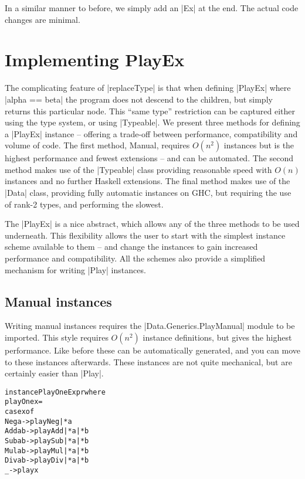 \documentclass[preprint]{sigplanconf}
\newenvironment{code}{\begin{alltt}\small}{\end{alltt}}
\begin{document}
In a similar manner to before, we simply add an |Ex| at the end. The actual code changes are minimal.

\section{Implementing PlayEx}
\label{sec:implement_playex}

The complicating feature of |replaceType| is that when defining |PlayEx| where |alpha == beta| the program does not descend to the children, but simply returns this particular node. This ``same type'' restriction can be captured either using the type system, or using |Typeable|. We present three methods for defining a |PlayEx| instance -- offering a trade-off between performance, compatibility and volume of code. The first method, Manual, requires $O(n^2)$ instances but is the highest performance and fewest extensions -- and can be automated. The second method makes use of the |Typeable| class providing reasonable speed with $O(n)$ instances and no further Haskell extensions. The final method makes use of the |Data| class, providing fully automatic instances on GHC, but requiring the use of rank-2 types, and performing the slowest.

The |PlayEx| is a nice abstract, which allows any of the three methods to be used underneath. This flexibility allows the user to start with the simplest instance scheme available to them -- and change the instances to gain increased performance and compatibility. All the schemes also provide a simplified mechanism for writing |Play| instances.

\subsection{Manual instances}

Writing manual instances requires the |Data.Generics.PlayManual| module to be imported. This style requires $O(n^2)$ instance definitions, but gives the highest performance. Like before these can be automatically generated, and you can move to these instances afterwards. These instances are not quite mechanical, but are certainly easier than |Play|.

\begin{code}
instance PlayOne Expr where
    playOne x =
        case x of
            Neg  a    -> play Neg  |* a
            Add  a b  -> play Add  |* a |* b
            Sub  a b  -> play Sub  |* a |* b
            Mul  a b  -> play Mul  |* a |* b
            Div  a b  -> play Div  |* a |* b
            _         -> play x
\end{code}
\end{document}
